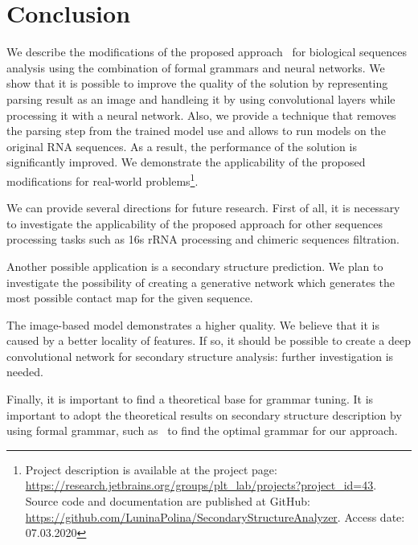 \section{Conclusion}
We describe the modifications of the proposed approach~\cite{grigorevcomposition} for biological sequences analysis using the combination of formal grammars and neural networks.
We show that it is possible to improve the quality of the solution by representing parsing result as an image and handleing it by using convolutional layers while processing it with a neural network.
Also, we provide a technique that removes the parsing step from the trained model use and allows to run models on the original RNA sequences.
As a result, the performance of the solution is significantly improved.
We demonstrate the applicability of the proposed modifications for real-world problems\footnote{
Project description is available at the project page: \url{https://research.jetbrains.org/groups/plt\_lab/projects?project\_id=43}.
Source code and documentation are published at GitHub: \url{https://github.com/LuninaPolina/SecondaryStructureAnalyzer}. Access date: 07.03.2020}.

We can provide several directions for future research.
First of all, it is necessary to investigate the applicability of the proposed approach for other sequences processing tasks such as 16s rRNA processing and chimeric sequences filtration.

Another possible application is a secondary structure prediction.
We plan to investigate the possibility of creating a generative network which generates the most possible contact map for the given sequence.

The image-based model demonstrates a higher quality.
We believe that it is caused by a better locality of features.
If so, it should be possible to create a deep convolutional network for secondary structure analysis: further investigation is needed.

Finally, it is important to find a theoretical base for grammar tuning.
It is important to adopt the theoretical results on secondary structure description by using formal grammar, such as~\cite{MQbioinformatics19} to find the optimal grammar for our approach.
